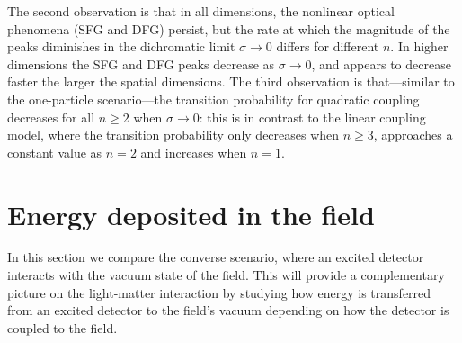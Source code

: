 \documentclass[prd,twocolumn,superscriptaddress,nofootinbib,floatfix,amsmath,amssymb]{revtex4-2}
\newcommand{\eri}[1]{\textcolor{OliveGreen}{\textbf{[\textbf{\textcolor{black}{Erickson}}: #1]}}}
\begin{document}
    
    The second observation is that in all dimensions, the nonlinear optical phenomena (SFG and DFG) persist, but the rate at which the magnitude of the peaks diminishes in the dichromatic limit $\sigma\to 0$ differs for different $n$. In higher dimensions the SFG and DFG peaks decrease as $\sigma\to 0$, and appears to decrease faster the larger the spatial dimensions. The third observation is that---similar to the one-particle scenario---the transition probability for quadratic coupling decreases for all $n\geq 2$ when $\sigma\to 0$: this is in contrast to the linear coupling model, where the transition probability only decreases when $n\geq 3$, approaches a constant value as $n=2$ and increases when $n=1$.
    
    
    
    
    
    
    
    
    
    
    
    
    
    
    
   




    





    \section{Energy deposited in the field}
    \label{sec:energydeposit}
    
    
    In this section we compare the converse scenario, where an excited detector interacts with the vacuum state of the field. This will provide a complementary picture on the light-matter interaction by studying how energy is transferred from an excited detector to the field's vacuum depending on how the detector is coupled to the field. 
    
\end{document}
